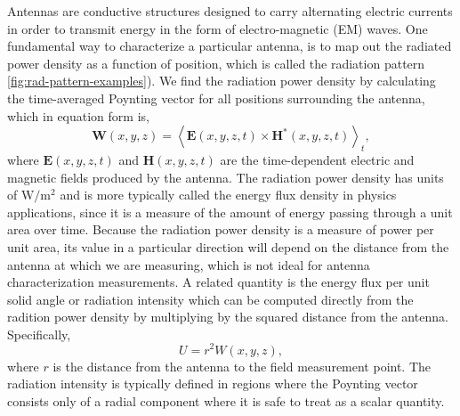 Antennas are conductive structures designed to carry alternating electric currents in order to transmit energy in the form of electro-magnetic (EM) waves. One fundamental way to characterize a particular antenna, is to map out the radiated power density as a function of position, which is called the radiation pattern \ref{fig:rad-pattern-examples}). We find the radiation power density by calculating the time-averaged Poynting vector for all positions surrounding the antenna, which in equation form is,
\begin{equation}
    \mathbf{W}(x,y,z) = \left<\mathbf{E}(x,y,z,t)\times\mathbf{H}^\ast(x,y,z,t)\right>_t,
\end{equation}
where $\mathbf{E}(x,y,z,t)$ and $\mathbf{H}(x,y,z,t)$ are the time-dependent electric and magnetic fields produced by the antenna. The radiation power density has units of $\mathrm{W}/\mathrm{m}^2$ and is more typically called the energy flux density in physics applications, since it is a measure of the amount of energy passing through a unit area over time. Because the radiation power density is a measure of power per unit area, its value in a particular direction will depend on the distance from the antenna at which we are measuring, which is not ideal for antenna characterization measurements. A related quantity is the energy flux per unit solid angle or radiation intensity which can be computed directly from the radition power density by multiplying by the squared distance from the antenna. Specifically,
\begin{equation}
    U = r^2W(x,y,z),
\end{equation}
where $r$ is the distance from the antenna to the field measurement point. The radiation intensity is typically defined in regions where the Poynting vector consists only of a radial component where it is safe to treat as a scalar quantity. 

